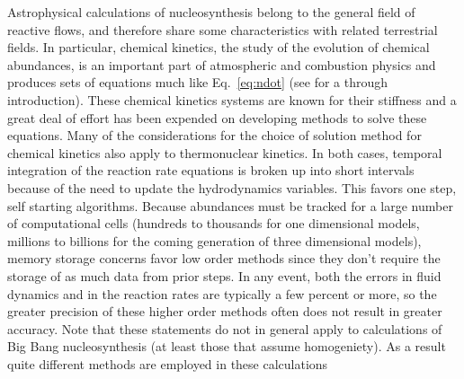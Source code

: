 \documentclass[12pt,modern,tighten,times,apj]{aastex61}
\begin{document}
Astrophysical calculations of nucleosynthesis belong to the general field of
reactive flows, and therefore share some characteristics with related
terrestrial fields.  In particular, chemical kinetics, the study of the
evolution of chemical abundances, is an important part of atmospheric and
combustion physics and produces sets of equations much like Eq.~\ref{eq:ndot}
(see \cite{OrBo01} for a through introduction).  These chemical kinetics systems
are known for their stiffness and a great deal of effort has been expended on
developing methods to solve these equations.  Many of the considerations for
the choice of solution method for chemical kinetics also 
apply to thermonuclear kinetics.  In both cases, temporal integration of
the reaction rate equations is broken up into short intervals because of the
need to update the hydrodynamics variables.  This favors one step, self
starting algorithms.  Because abundances must be tracked for a large number of
computational cells (hundreds to thousands for one dimensional models,
millions to billions for the coming generation of three dimensional models), memory storage concerns favor low order methods since they don't require  the storage of as much data from prior steps.  In any event, both the errors in fluid dynamics and in the reaction rates are typically a few percent or more, so the greater precision of these higher order methods often does not result in greater accuracy.  Note that these statements do not in general apply to calculations of Big Bang nucleosynthesis (at least those that assume homogeniety). As a result quite different methods are employed in these calculations \cite{FiOl04}
\end{document}
